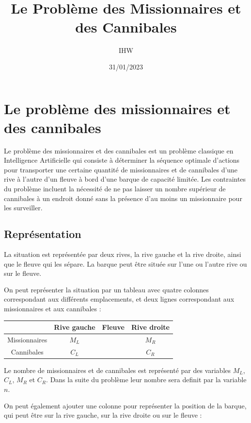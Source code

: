 \documentclass{article}
\title{Le Problème des Missionnaires et des Cannibales}
\author{IHW}
\date{31/01/2023}
\begin{document}
\maketitle

\section{Le problème des missionnaires et des cannibales}

Le problème des missionnaires et des cannibales est un problème classique en Intelligence Artificielle qui consiste à déterminer la séquence optimale d'actions pour transporter une certaine quantité de missionnaires et de cannibales d'une rive à l'autre d'un fleuve à bord d'une barque de capacité limitée. Les contraintes du problème incluent la nécessité de ne pas laisser un nombre supérieur de cannibales à un endroit donné sans la présence d'au moins un missionnaire pour les surveiller.


\subsection{Représentation}

La situation est représentée par deux rives, la rive gauche et la rive droite, ainsi que le fleuve qui les sépare. La barque peut être située sur l'une ou l'autre rive ou sur le fleuve.

\noindent On peut représenter la situation par un tableau avec quatre colonnes correspondant aux différents emplacements, et deux lignes correspondant aux missionnaires et aux cannibales :

\begin{center}
\begin{tabular}{|c|c|c|c|}
\hline
& Rive gauche & Fleuve & Rive droite \\
\hline
Missionnaires & $M_L$ & & $M_R$ \\
\hline
Cannibales & $C_L$ & & $C_R$ \\
\hline
\end{tabular}
\end{center}

\noindent Le nombre de missionnaires et de cannibales est représenté par des variables $M_L$, $C_L$, $M_R$ et $C_R$. Dans la suite du problème leur nombre sera definit par la variable $n$.

\noindent On peut également ajouter une colonne pour représenter la position de la barque, qui peut être sur la rive gauche, sur la rive droite ou sur le fleuve :
\end{document}
